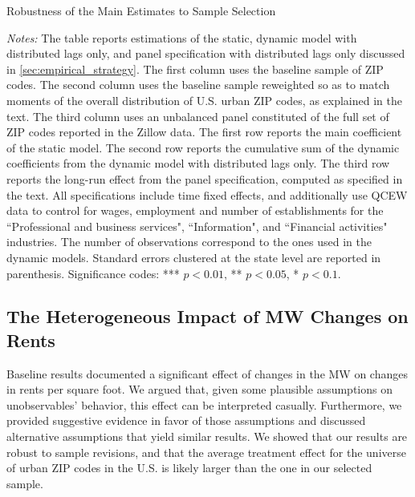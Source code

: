 \begin{table}[h!]\centering
	\caption{Robustness of the Main Estimates to Sample Selection}  %
	\label{tab:wgt_unbal_comparison}
	
	\begin{minipage}{0.95\textwidth}\footnotesize
	\vspace{3mm}	
	\textit{Notes:} The table reports estimations of the static, dynamic model with distributed
	lags only, and panel specification with distributed lags only discussed in 
	\autoref{sec:empirical_strategy}. The first column uses the baseline sample of ZIP codes. The 
	second column uses the baseline sample reweighted so as to match moments of the overall 
	distribution of U.S. urban ZIP codes, as explained in the text. The third column uses an 
	unbalanced 	panel constituted of the full set of ZIP codes reported in the Zillow data. The 
	first row reports the main coefficient of the static model. The second row reports the 
	cumulative sum of the dynamic coefficients from the dynamic model with distributed lags only. 
	The third row reports the long-run effect from the panel specification, computed as specified 
	in the text. All specifications include time fixed effects, and additionally use QCEW data to 
	control for wages, employment and number of establishments for the ``Professional and business 
	services", ``Information", and ``Financial activities" industries. The number of observations 
	correspond to the ones used in the dynamic models. 
	Standard errors clustered at the state level are reported in parenthesis. Significance codes: 
	*** $p < 0.01$, ** $p < 0.05$, * $p < 0.1$.
	\end{minipage}
\end{table}



\subsection{The Heterogeneous Impact of MW Changes on Rents}\label{sec:heter}

Baseline results documented a significant effect of changes in the MW
on changes in rents per square foot. We argued that, given some plausible assumptions on
unobservables' behavior, this effect can be interpreted casually. Furthermore, we provided
suggestive evidence in favor of those assumptions and discussed alternative assumptions 
that yield similar results. We showed that our results are robust to sample revisions, 
and that the average treatment effect for the 
universe of urban ZIP codes in the U.S. is likely larger than the one in our selected sample. 


